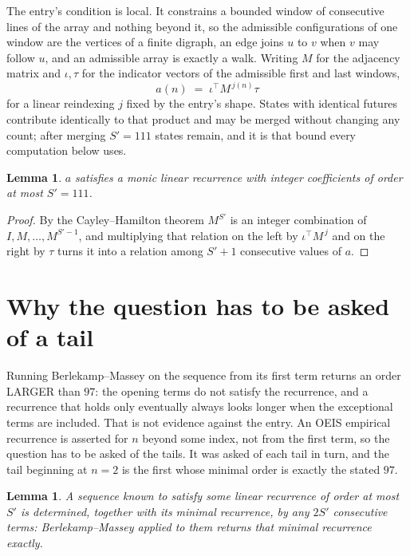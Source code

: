 \documentclass[11pt,a4paper]{article}
\theoremstyle{plain}
\newtheorem{lemma}[theorem]{Lemma}
\theoremstyle{definition}
\begin{document}
The entry's condition is local. It constrains a bounded window of consecutive lines of the
array and nothing beyond it, so the admissible configurations of one window are the vertices of
a finite digraph, an edge joins $u$ to $v$ when $v$ may follow $u$, and an admissible array is
exactly a walk. Writing $M$ for the adjacency matrix and $\iota,\tau$ for the indicator vectors
of the admissible first and last windows,
\[
a(n)\;=\;\iota^{\!\top}M^{\,j(n)}\tau
\]
for a linear reindexing $j$ fixed by the entry's shape. States with identical futures
contribute identically to that product and may be merged without changing any count; after
merging $S'=111$ states remain, and it is that bound every computation below uses.

\begin{lemma}\label{lem:cf}
$a$ satisfies a monic linear recurrence with integer coefficients of order at most $S'=111$.
\end{lemma}

\begin{proof}
By the Cayley--Hamilton theorem $M^{S'}$ is an integer combination of $I,M,\dots,M^{S'-1}$,
and multiplying that relation on the left by $\iota^{\!\top}M^{\,j}$ and on the right by
$\tau$ turns it into a relation among $S'+1$ consecutive values of $a$.
\end{proof}

\section{Why the question has to be asked of a tail}

Running Berlekamp--Massey on the sequence from its first term returns an order LARGER than $97$: the opening terms do not satisfy the recurrence, and a recurrence that holds only eventually always looks longer when the exceptional terms are included. That is not evidence against the entry. An OEIS empirical recurrence is asserted for $n$ beyond some index, not from the first term, so the question has to be asked of the tails. It was asked of each tail in turn, and the tail beginning at $n=2$ is the first whose minimal order is exactly the stated $97$.

\begin{lemma}\label{lem:bm}
A sequence known to satisfy some linear recurrence of order at most $S'$ is determined,
together with its minimal recurrence, by any $2S'$ consecutive terms: Berlekamp--Massey applied
to them returns that minimal recurrence exactly.
\end{lemma}
\end{document}
